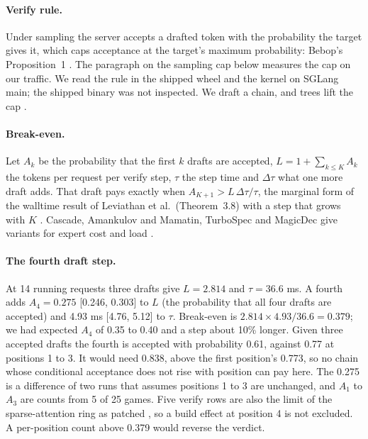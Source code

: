 \paragraph{Verify rule.}
Under sampling the server accepts a drafted token with the probability the target gives it, which caps acceptance at the target's maximum probability: Bebop's Proposition~1 \citep{li2026bebop}. %
The paragraph on the sampling cap below measures the cap on our traffic. %
We read the rule in the shipped wheel and the kernel on SGLang main; the shipped binary was not inspected. %
We draft a chain, and trees lift the cap \citep{chen2024sequoia}.

\paragraph{Break-even.}
Let $A_k$ be the probability that the first $k$ drafts are accepted, $L=1+\sum_{k\le K}A_k$ the tokens per request per verify step, $\tau$ the step time and $\Delta\tau$ what one more draft adds.
That draft pays exactly when $A_{K+1}>L\,\Delta\tau/\tau$, the marginal form of the walltime result of Leviathan et al.\ (Theorem~3.8) with a step that grows with $K$ \citep{leviathan2022speculative}.
Cascade, Amankulov and Mamatin, TurboSpec and MagicDec give variants for expert cost and load \citep{saxena2025cascade,amankulov2026limits,liu2024turbospec,sadhukhan2024magicdec}.

\paragraph{The fourth draft step.}
At 14 running requests three drafts give $L=2.814$ and $\tau=36.6$ ms. %
A fourth adds $A_4=0.275$ [0.246, 0.303] to $L$ (the probability that all four drafts are accepted) and 4.93 ms [4.76, 5.12] to $\tau$. %
Break-even is $2.814\times4.93/36.6=0.379$; we had expected $A_4$ of 0.35 to 0.40 and a step about 10\% longer. %
Given three accepted drafts the fourth is accepted with probability 0.61, against 0.77 at positions 1 to 3. %
It would need 0.838, above the first position's 0.773, so no chain whose conditional acceptance does not rise with position can pay here. %
The 0.275 is a difference of two runs that assumes positions 1 to 3 are unchanged, and $A_1$ to $A_3$ are counts from 5 of 25 games. %
Five verify rows are also the limit of the sparse-attention ring as patched \citep{lovedheart2026qsa}, so a build effect at position 4 is not excluded. %
A per-position count above 0.379 would reverse the verdict.


